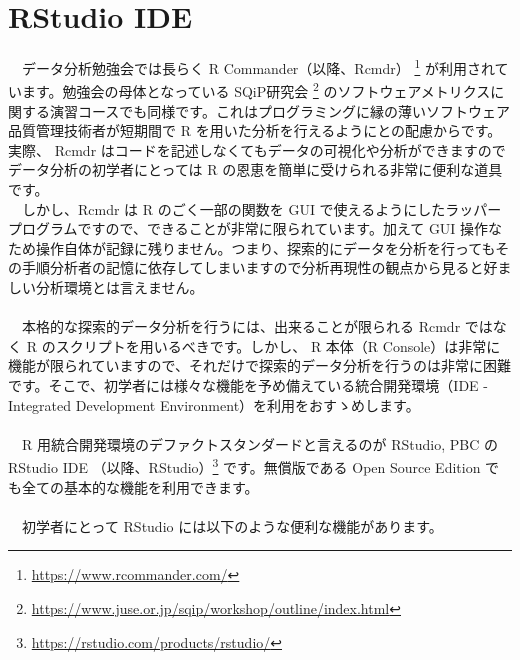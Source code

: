 \documentclass[
  12pt,
]{book}
\DeclareRobustCommand{\href}[2]{#2\footnote{\url{#1}}}
\begin{document}
\hypertarget{rstudio-ide}{%
\chapter{RStudio IDE}\label{rstudio-ide}}

　データ分析勉強会では長らく \href{https://www.rcommander.com/}{R Commander（以降、Rcmdr） } が利用されています。勉強会の母体となっている \href{https://www.juse.or.jp/sqip/workshop/outline/index.html}{SQiP研究会 } のソフトウェアメトリクスに関する演習コースでも同様です。これはプログラミングに縁の薄いソフトウェア品質管理技術者が短期間で R を用いた分析を行えるようにとの配慮からです。実際、 Rcmdr はコードを記述しなくてもデータの可視化や分析ができますのでデータ分析の初学者にとっては R の恩恵を簡単に受けられる非常に便利な道具です。\\
　しかし、Rcmdr は R のごく一部の関数を GUI で使えるようにしたラッパープログラムですので、できることが非常に限られています。加えて GUI 操作なため操作自体が記録に残りません。つまり、探索的にデータを分析を行ってもその手順分析者の記憶に依存してしまいますので分析再現性の観点から見ると好ましい分析環境とは言えません。\\
　\\
　本格的な探索的データ分析を行うには、出来ることが限られる Rcmdr ではなく R のスクリプトを用いるべきです。しかし、 R 本体（R Console）は非常に機能が限られていますので、それだけで探索的データ分析を行うのは非常に困難です。そこで、初学者には様々な機能を予め備えている統合開発環境（IDE - Integrated Development Environment）を利用をおすゝめします。\\
　\\
　R 用統合開発環境のデファクトスタンダードと言えるのが RStudio, PBC の \href{https://rstudio.com/products/rstudio/}{RStudio IDE （以降、RStudio）} です。無償版である Open Source Edition でも全ての基本的な機能を利用できます。\\
　\\
　初学者にとって RStudio には以下のような便利な機能があります。
\end{document}
